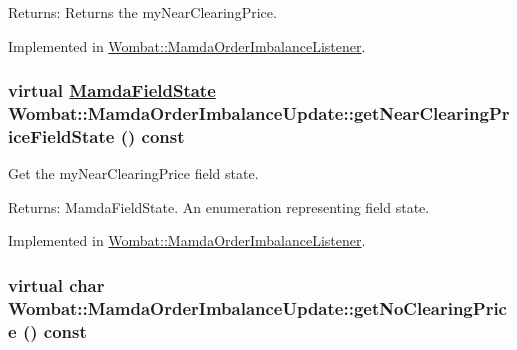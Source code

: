 \begin{Desc}
\item[Returns:]Returns the my\-Near\-Clearing\-Price. \end{Desc}


Implemented in \hyperlink{classWombat_1_1MamdaOrderImbalanceListener_179bd16864d6c3bc9bf7758759f2e336}{Wombat::Mamda\-Order\-Imbalance\-Listener}.\hypertarget{classWombat_1_1MamdaOrderImbalanceUpdate_7e9327e36a0261dc4ec1e8fad116f994}{
\subsubsection[getNearClearingPriceFieldState]{\setlength{\rightskip}{0pt plus 5cm}virtual \hyperlink{namespaceWombat_93aac974f2ab713554fd12a1fa3b7d2a}{Mamda\-Field\-State} Wombat::Mamda\-Order\-Imbalance\-Update::get\-Near\-Clearing\-Price\-Field\-State () const}}
\label{classWombat_1_1MamdaOrderImbalanceUpdate_7e9327e36a0261dc4ec1e8fad116f994}


Get the my\-Near\-Clearing\-Price field state. 

\begin{Desc}
\item[Returns:]Mamda\-Field\-State. An enumeration representing field state. \end{Desc}


Implemented in \hyperlink{classWombat_1_1MamdaOrderImbalanceListener_f7935fdf67c67ffefadc39456a39448d}{Wombat::Mamda\-Order\-Imbalance\-Listener}.\hypertarget{classWombat_1_1MamdaOrderImbalanceUpdate_64c6b3c0341f7e20ced1c35897789b3d}{
\subsubsection[getNoClearingPrice]{\setlength{\rightskip}{0pt plus 5cm}virtual char Wombat::Mamda\-Order\-Imbalance\-Update::get\-No\-Clearing\-Price () const}}
\label{classWombat_1_1MamdaOrderImbalanceUpdate_64c6b3c0341f7e20ced1c35897789b3d}


